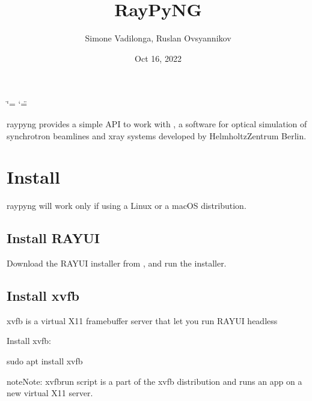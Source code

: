 \documentclass[letterpaper,10pt,english]{sphinxmanual}
\title{RayPyNG}
\date{Oct 16, 2022}
\author{Simone Vadilonga, Ruslan Ovsyannikov}
\begin{document}
\ifdefined\shorthandoff
  \ifnum\catcode`\=\string=\active\shorthandoff{=}\fi
  \ifnum\catcode`\"=\active{}\fi
\fi

\pagestyle{empty}
\sphinxmaketitle
\pagestyle{plain}
\sphinxtableofcontents
\pagestyle{normal}
\label{\detokenize{index::doc}}


\sphinxAtStartPar
raypyng provides a simple API to work with
,
a software for optical simulation of synchrotron
beamlines and x\sphinxhyphen{}ray systems developed by
Helmholtz\sphinxhyphen{}Zentrum Berlin.

\sphinxstepscope


\chapter{Install}
\label{\detokenize{install_raypyng:install}}\label{\detokenize{install_raypyng::doc}}
\sphinxAtStartPar
raypyng will work only if using a Linux or a macOS distribution.


\section{Install RAY\sphinxhyphen{}UI}
\label{\detokenize{install_raypyng:install-ray-ui}}
\sphinxAtStartPar
Download the RAY\sphinxhyphen{}UI installer from  ,
and run the installer.


\section{Install xvfb}
\label{\detokenize{install_raypyng:install-xvfb}}
\sphinxAtStartPar
xvfb is a virtual X11 framebuffer server that let you run RAY\sphinxhyphen{}UI headless

\sphinxAtStartPar
Install xvfb:

\begin{sphinxVerbatim}[commandchars=\\\{\}]
sudo apt install xvfb
\end{sphinxVerbatim}

\begin{sphinxadmonition}{note}{Note:}
\sphinxAtStartPar
xvfb\sphinxhyphen{}run script is a part of the xvfb distribution and
runs an app on a new virtual X11 server.
\end{sphinxadmonition}
\end{document}
